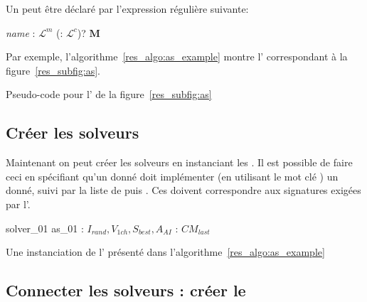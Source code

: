 Un \as{} peut être déclaré par l'expression régulière suivante:

\begin{center}
 {\it name} : $\mathcal{L}^m$ (: $\mathcal{L}^c$)?  $\mathbf{M}$ 
\end{center}

Par exemple, l'algorithme~\ref{res_algo:as_example} montre l'\infr{\as{}} correspondant à la figure~\ref{res_subfig:as}.

\begin{algorithm}[h]
\dontprintsemicolon
\scriptsize
\SetInd{2pt}{3pt}
\SetNoline
{}
\caption{Pseudo-code \posl{} pour l'\infr{\as{}} de la figure~\ref{res_subfig:as}}\label{res_algo:as_example}
\end{algorithm}

\subsection{Créer les solveurs}

Maintenant on peut créer les solveurs en instanciant les \infr{\ms}. Il est possible de faire ceci en spécifiant qu'un \mbox{} donné doit implémenter (en utilisant le mot clé \mbox{}) un \as{} donné, suivi par la liste de \infr{\omprefix{}} puis \infr{\opchs{}}. Ces \ms{} doivent correspondre aux signatures exigées par l'\infr{\as}.

\begin{algorithm}[h]
\dontprintsemicolon
\scriptsize
\SetNoline
{}
 solver\_01  as\_01\;
 : $I_{rand}, V_{1ch}, S_{best}, A_{AI}$ \; 
: $CM_{last}$\;
\caption{Une instanciation de l'\as{} présenté dans l'algorithme~\ref{res_algo:as_example}}\label{res_algo:solver_def}
\end{algorithm}

\subsection{Connecter les solveurs : créer le \soset}

